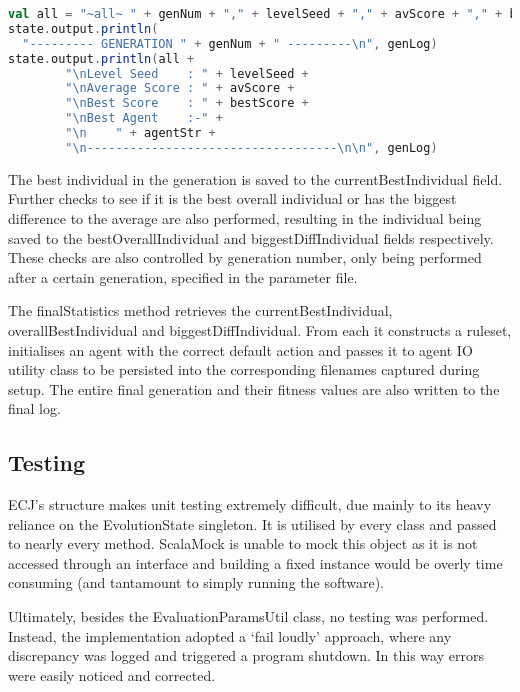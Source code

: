 \begin{minipage}{0.9\linewidth}
\centering
\begin{lstlisting}[language=scala]
val all = "~all~ " + genNum + "," + levelSeed + "," + avScore + "," + bestScore
state.output.println(
  "--------- GENERATION " + genNum + " ---------\n", genLog)
state.output.println(all + 
        "\nLevel Seed    : " + levelSeed + 
        "\nAverage Score : " + avScore + 
        "\nBest Score    : " + bestScore + 
        "\nBest Agent    :-" +
        "\n    " + agentStr + 
        "\n-----------------------------------\n\n", genLog)
\end{lstlisting}
\end{minipage}
 
The best individual in the generation is saved to the currentBestIndividual field. Further checks to see if it is the best overall individual or has the biggest difference to the average are also performed, resulting in the individual being saved to the bestOverallIndividual and biggestDiffIndividual fields respectively. These checks are also controlled by generation number, only being performed after a certain generation, specified in the parameter file.

The finalStatistics method retrieves the current\-Best\-Individual, overall\-Best\-Individual and biggest\-Diff\-Individual. From each it constructs a ruleset, initialises an agent with the correct default action and passes it to agent IO utility class to be persisted into the corresponding filenames captured during setup. The entire final generation and their fitness values are also written to the final log.



\subsection{Testing}
\label{subsec:learntest}

ECJ's structure makes unit testing extremely difficult, due mainly to its heavy reliance on the EvolutionState singleton. It is utilised by every class and passed to nearly every method. ScalaMock is unable to mock this object as it is not accessed through an interface and building a fixed instance would be overly time consuming (and tantamount to simply running the software).

Ultimately, besides the EvaluationParamsUtil class, no testing was performed. Instead, the implementation adopted a `fail loudly' approach, where any discrepancy was logged and triggered a program shutdown. In this way errors were easily noticed and corrected.

